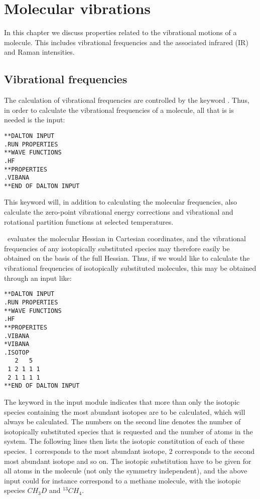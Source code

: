 \chapter{Molecular vibrations}\label{ch:vibrot}

In this chapter we discuss properties related  to the
vibrational motions of a molecule. This includes
vibrational frequencies and the associated infrared
(IR) and Raman intensities.

\section{Vibrational frequencies}\label{sec:vibfreq}

The calculation of vibrational frequencies are
controlled by the keyword . Thus, in order to
calculate the vibrational frequencies
of a molecule, all that is is needed is the input:

\begin{verbatim}
**DALTON INPUT
.RUN PROPERTIES
**WAVE FUNCTIONS
.HF
**PROPERTIES
.VIBANA
**END OF DALTON INPUT
\end{verbatim}

This keyword will, in addition to calculating the molecular
frequencies, also calculate the zero-point vibrational 
energy corrections and vibrational
and rotational partition functions
at selected temperatures.

\siraba\ evaluates the molecular Hessian in Cartesian
coordinates, and
the vibrational frequencies of any isotopically substituted  species
may therefore easily be obtained on the basis of the full
Hessian. Thus, if we would like to calculate the vibrational
frequencies of isotopically substituted molecules, this may be obtained through an input like:

\begin{verbatim}
**DALTON INPUT
.RUN PROPERTIES
**WAVE FUNCTIONS
.HF
**PROPERITES
.VIBANA
*VIBANA
.ISOTOP
   2   5
 1 2 1 1 1
 2 1 1 1 1
**END OF DALTON INPUT
\end{verbatim}

The keyword  in the  input module
indicates that more than only the isotopic species containing the most
abundant isotopes are to be calculated, which will always be
calculated. The numbers on the second line denotes the number of
isotopically substituted species that is requested and the number of
atoms in the system. The following lines then
lists the isotopic constitution of each of these species. 1
corresponds to the most abundant isotope, 2 corresponds to the second
most abundant isotope and so on. The isotopic substitution have to be
given for all atoms in the molecule (not only the symmetry
independent), and the above input could for instance correspond to a
methane molecule, with the isotopic species $CH_3D$
and $^{13}CH_4$.

